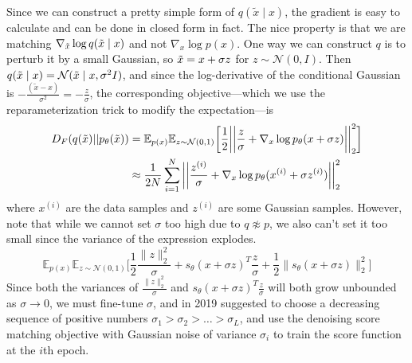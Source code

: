     Since we can construct a pretty simple form of $q(\tilde{x} \mid x)$, the gradient is easy to calculate and can be done in closed form in fact. The nice property is that we are matching $\nabla_{\Tilde{x}} \log q(\Tilde{x} \mid x)$ and not $\nabla_x \log p(x)$. One way we can construct $q$ is to perturb it by a small Gaussian, so $\Tilde{x} = x + \sigma z$ for $z \sim \mathcal{N}(0, I)$. Then $q(\Tilde{x} \mid x) = \mathcal{N}(\Tilde{x} \mid x, \sigma^2 I)$, and since the log-derivative of the conditional Gaussian is $-\frac{(\tilde{x} - x)}{\sigma^2} = -\frac{z}{\sigma}$, the corresponding objective---which we use the reparameterization trick to modify the expectation---is 
    \begin{align}
      D_F (q(\Tilde{x}) || p_\theta (\Tilde{x})) & = \mathbb{E}_{p(x)} \mathbb{E}_{z \sim \mathcal{N}(0, 1)} \bigg[ \frac{1}{2} \bigg| \bigg| \frac{z}{\sigma} + \nabla_x \log p_\theta (x + \sigma z) \bigg| \bigg|_2^2 \bigg] \\
                                                 & \approx \frac{1}{2N} \sum_{i=1}^N \bigg|\bigg| \frac{z^{(i)}}{\sigma} + \nabla_x \log p_\theta (x^{(i)} + \sigma z^{(i)}) \bigg|\bigg|_2^2
    \end{align}
    where $x^{(i)}$ are the data samples and $z^{(i)}$ are some Gaussian samples. However, note that while we cannot set $\sigma$ too high due to $q \not\approx p$, we also can't set it too small since the variance of the expression explodes. 
    \begin{equation}
      \mathbb{E}_{p(x)} \mathbb{E}_{z \sim \mathcal{N}(0, 1)} \bigg[ \frac{1}{2}\frac{\|z\|_2^2}{\sigma} + s_\theta(x + \sigma z)^T \frac{z}{\sigma} + \frac{1}{2}\big\|s_\theta(x + \sigma z)\big\|_2^2 \bigg]
    \end{equation}
    Since both the variances of $\frac{\|z\|_2^2}{\sigma}$ and $s_\theta(x + \sigma z)^T \frac{z}{\sigma}$ will both grow unbounded as $\sigma \rightarrow 0$, we must fine-tune $\sigma$, and \cite{score} in 2019 suggested to choose a decreasing sequence of positive numbers $\sigma_1 > \sigma_2 > \ldots > \sigma_L$, and use the denoising score matching objective with Gaussian noise of variance $\sigma_i$ to train the score function at the $i$th epoch. 

